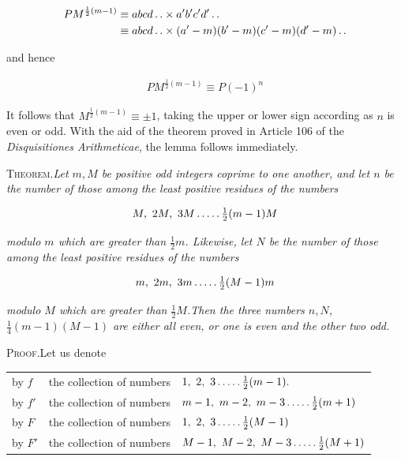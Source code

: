 \[
\begin{aligned}
PM^{\frac12(m-1)}&\equiv abcd\mathinner{.\,.}\times a'b'c'd'\mathinner{.\,.}\\&\equiv abcd\mathinner{.\,.}\times(a'-m)(b'-m)(c'-m)(d'-m)\mathinner{.\,.}
\end{aligned}
\]

and hence

\[
\begin{aligned}
PM^{\frac12(m-1)}\equiv P(-1)^n
\end{aligned}
\]

It follows that $M^{\frac12(m-1)}\equiv\pm1$, taking the upper or lower sign according as $n$ is even or odd. With the aid of the theorem proved in Article 106 of the \textit{Disquisitiones Arithmeticae}, the lemma follows immediately.


\textsc{Theorem.}\quad \textit{Let $m,M$ be positive odd integers coprime to one another, and let $n$ be the number of those among the least positive residues of the numbers}

\[
\begin{aligned}
M,\ 2M,\ 3M\mathinner{.\,.\,.\,.\,.}\tfrac12(m-1)M
\end{aligned}
\]

\textit{modulo $m$ which are greater than $\frac12m$. Likewise, let $N$ be the number of those among the least positive residues of the numbers}

\[
\begin{aligned}
m,\ 2m,\ 3m\mathinner{.\,.\,.\,.\,.}\tfrac12(M-1)m
\end{aligned}
\]

\textit{modulo $M$ which are greater than $\frac12M$.\quad Then the three numbers $n,N$, $\frac14(m-1)(M-1)$ are either all even, or one is even and the other two odd.}

\textsc{Proof.}\quad Let us denote

{\small
\begin{center}\setlength{\tabcolsep}{3pt}
\begin{tabular}{@{}lll@{}}
by $f$ & the collection of numbers & $1,\ 2,\ 3\dotsfive\frac12(m-1)\mathord{.}$ \\
by $f'$ & the collection of numbers & $m-1,\ m-2,\ m-3\dotsfive\frac12(m+1)$ \\
by $F$ & the collection of numbers & $1,\ 2,\ 3\dotsfive\frac12(M-1)$ \\
by $F'$ & the collection of numbers & $M-1,\ M-2,\ M-3\dotsfive\frac12(M+1)$
\end{tabular}\end{center}
}

